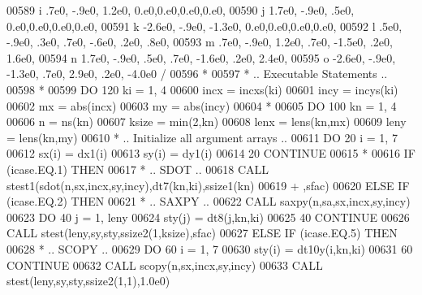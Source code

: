 \begin{DoxyCode}
00589      i            .7e0,  -.9e0,  1.2e0,             0.e0,0.e0,0.e0,0.e0,
00590      j           1.7e0,  -.9e0,   .5e0,             0.e0,0.e0,0.e0,0.e0,
00591      k          -2.6e0,  -.9e0, -1.3e0,             0.e0,0.e0,0.e0,0.e0,
00592      l            .5e0,  -.9e0,   .3e0,   .7e0,  -.6e0,   .2e0,   .8e0,
00593      m            .7e0,  -.9e0,  1.2e0,   .7e0, -1.5e0,   .2e0,  1.6e0,
00594      n           1.7e0,  -.9e0,   .5e0,   .7e0, -1.6e0,   .2e0,  2.4e0,
00595      o          -2.6e0,  -.9e0, -1.3e0,   .7e0,  2.9e0,   .2e0, -4.0e0 /
00596 \textcolor{comment}{*}
00597 \textcolor{comment}{*     .. Executable Statements ..}
00598 \textcolor{comment}{*}
00599       \textcolor{keywordflow}{DO} 120 ki = 1, 4
00600          incx = incxs(ki)
00601          incy = incys(ki)
00602          mx = abs(incx)
00603          my = abs(incy)
00604 \textcolor{comment}{*}
00605          \textcolor{keywordflow}{DO} 100 kn = 1, 4
00606             n = ns(kn)
00607             ksize = min(2,kn)
00608             lenx = lens(kn,mx)
00609             leny = lens(kn,my)
00610 \textcolor{comment}{*           .. Initialize all argument arrays ..}
00611             \textcolor{keywordflow}{DO} 20 i = 1, 7
00612                sx(i) = dx1(i)
00613                sy(i) = dy1(i)
00614    20       \textcolor{keywordflow}{CONTINUE}
00615 \textcolor{comment}{*}
00616             \textcolor{keywordflow}{IF} (icase.EQ.1) \textcolor{keywordflow}{THEN}
00617 \textcolor{comment}{*              .. SDOT ..}
00618                \textcolor{keyword}{CALL }stest1(sdot(n,sx,incx,sy,incy),dt7(kn,ki),ssize1(kn)
00619      +                     ,sfac)
00620             \textcolor{keywordflow}{ELSE} \textcolor{keywordflow}{IF} (icase.EQ.2) \textcolor{keywordflow}{THEN}
00621 \textcolor{comment}{*              .. SAXPY ..}
00622                \textcolor{keyword}{CALL }saxpy(n,sa,sx,incx,sy,incy)
00623                \textcolor{keywordflow}{DO} 40 j = 1, leny
00624                   sty(j) = dt8(j,kn,ki)
00625    40          \textcolor{keywordflow}{CONTINUE}
00626                \textcolor{keyword}{CALL }stest(leny,sy,sty,ssize2(1,ksize),sfac)
00627             \textcolor{keywordflow}{ELSE} \textcolor{keywordflow}{IF} (icase.EQ.5) \textcolor{keywordflow}{THEN}
00628 \textcolor{comment}{*              .. SCOPY ..}
00629                \textcolor{keywordflow}{DO} 60 i = 1, 7
00630                   sty(i) = dt10y(i,kn,ki)
00631    60          \textcolor{keywordflow}{CONTINUE}
00632                \textcolor{keyword}{CALL }scopy(n,sx,incx,sy,incy)
00633                \textcolor{keyword}{CALL }stest(leny,sy,sty,ssize2(1,1),1.0e0)

\end{DoxyCode}
